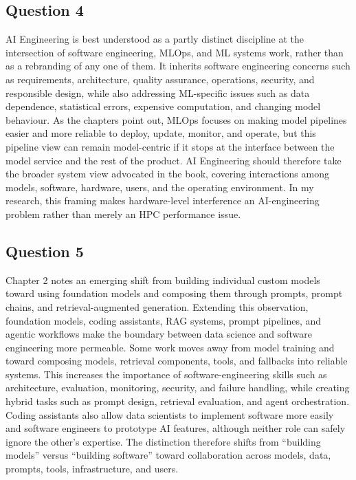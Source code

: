 \documentclass{article}
\begin{document}
\subsection{Question 4}

AI Engineering is best understood as a partly distinct discipline at the
intersection of software engineering, MLOps, and ML systems work, rather than
as a rebranding of any one of them. It inherits software engineering concerns
such as requirements, architecture, quality assurance, operations, security,
and responsible design, while also addressing ML-specific issues such as data
dependence, statistical errors, expensive computation, and changing model
behaviour. As the chapters point out, MLOps focuses on making model pipelines
easier and more reliable to deploy, update, monitor, and operate, but this
pipeline view can remain model-centric if it stops at the interface between the
model service and the rest of the product. AI Engineering should therefore
take the broader system view advocated in the book, covering interactions
among models, software, hardware, users, and the operating environment. In my
research, this framing makes hardware-level interference an AI-engineering
problem rather than merely an HPC performance issue.

\subsection{Question 5}

Chapter 2 notes an emerging shift from building individual custom models
toward using foundation models and composing them through prompts, prompt
chains, and retrieval-augmented generation. Extending this observation,
foundation models, coding assistants, RAG systems, prompt pipelines, and
agentic workflows make the boundary between data science and software
engineering more permeable. Some work moves away from model training and
toward composing models, retrieval components, tools, and fallbacks into
reliable systems. This increases the importance of software-engineering skills
such as architecture, evaluation, monitoring, security, and failure handling,
while creating hybrid tasks such as prompt design, retrieval evaluation, and
agent orchestration. Coding assistants also allow data scientists to implement
software more easily and software engineers to prototype AI features, although
neither role can safely ignore the other's expertise. The distinction therefore
shifts from ``building models'' versus ``building software'' toward
collaboration across models, data, prompts, tools, infrastructure, and users.
\end{document}

